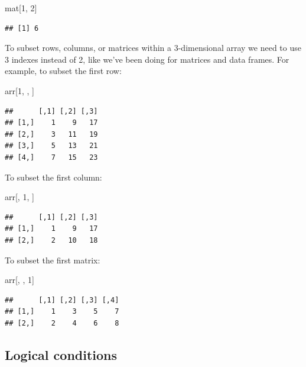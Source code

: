 \documentclass[
]{book}
\newenvironment{Shaded}{\begin{snugshade}}{\end{snugshade}}
\newcommand{\DecValTok}[1]{\textcolor[rgb]{0.00,0.00,0.81}{#1}}
\newcommand{\NormalTok}[1]{#1}
\begin{document}
\begin{Shaded}
\begin{Highlighting}[]
\NormalTok{mat[}\DecValTok{1}\NormalTok{, }\DecValTok{2}\NormalTok{]}
\end{Highlighting}
\end{Shaded}

\begin{verbatim}
## [1] 6
\end{verbatim}

To subset rows, columns, or matrices within a 3-dimensional array we need to use
3 indexes instead of 2, like we've been doing for matrices and data frames. For
example, to subset the first row:

\begin{Shaded}
\begin{Highlighting}[]
\NormalTok{arr[}\DecValTok{1}\NormalTok{, , ]}
\end{Highlighting}
\end{Shaded}

\begin{verbatim}
##      [,1] [,2] [,3]
## [1,]    1    9   17
## [2,]    3   11   19
## [3,]    5   13   21
## [4,]    7   15   23
\end{verbatim}

To subset the first column:

\begin{Shaded}
\begin{Highlighting}[]
\NormalTok{arr[, }\DecValTok{1}\NormalTok{, ]}
\end{Highlighting}
\end{Shaded}

\begin{verbatim}
##      [,1] [,2] [,3]
## [1,]    1    9   17
## [2,]    2   10   18
\end{verbatim}

To subset the first matrix:

\begin{Shaded}
\begin{Highlighting}[]
\NormalTok{arr[, , }\DecValTok{1}\NormalTok{]}
\end{Highlighting}
\end{Shaded}

\begin{verbatim}
##      [,1] [,2] [,3] [,4]
## [1,]    1    3    5    7
## [2,]    2    4    6    8
\end{verbatim}

\hypertarget{logical-conditions}{%
\subsection{Logical conditions}\label{logical-conditions}}
\end{document}
